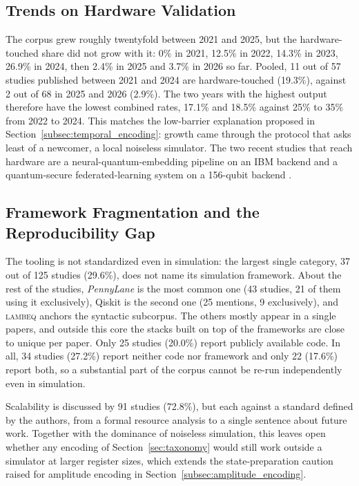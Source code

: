 \documentclass{ieeeaccess}
\begin{document}
\subsection{Trends on Hardware Validation}
\label{subsec:hardware_timeline}

The corpus grew roughly twentyfold between 2021 and 2025, but the hardware-touched share did not grow with it: 0\% in 2021, 12.5\% in 2022, 14.3\% in 2023, 26.9\% in 2024, then 2.4\% in 2025 and 3.7\% in 2026 so far.
Pooled, 11 out of 57 studies published between 2021 and 2024 are hardware-touched (19.3\%), against 2 out of 68 in 2025 and 2026 (2.9\%). The two years with the highest output therefore have the lowest combined rates, 17.1\% and 18.5\% against 25\% to 35\% from 2022 to 2024. This matches the low-barrier explanation proposed in Section~\ref{subsec:temporal_encoding}: growth came through the protocol that asks least of a newcomer, a local noiseless simulator. The two recent studies that reach hardware are a neural-quantum-embedding pipeline on an IBM backend \cite{baik_neural_2025} and a quantum-secure federated-learning system on a 156-qubit backend \cite{liu_experimentally_2026}.

\subsection{Framework Fragmentation and the Reproducibility Gap}
\label{subsec:reproducibility_gap}

The tooling is not standardized even in simulation: the largest single category, 37 out of 125 studies (29.6\%), does not name its simulation framework. About the rest of the studies, \textit{PennyLane} is the most common one (43 studies, 21 of them using it exclusively), Qiskit is the second one (25 mentions, 9 exclusively), and \textsc{lambeq} anchors the syntactic subcorpus. The others mostly appear in a single papers, and outside this core the stacks built on top of the frameworks are close to unique per paper. Only 25 studies (20.0\%) report publicly available code. In all, 34 studies (27.2\%) report neither code nor framework and only 22 (17.6\%) report both, so a substantial part of the corpus cannot be re-run independently even in simulation.

Scalability is discussed by 91 studies (72.8\%), but each against a standard defined by the authors, from a formal resource analysis to a single sentence about future work. Together with the dominance of noiseless simulation, this leaves open whether any encoding of Section~\ref{sec:taxonomy} would still work outside a simulator at larger register sizes, which extends the state-preparation caution raised for amplitude encoding in Section~\ref{subsec:amplitude_encoding}.
\end{document}
